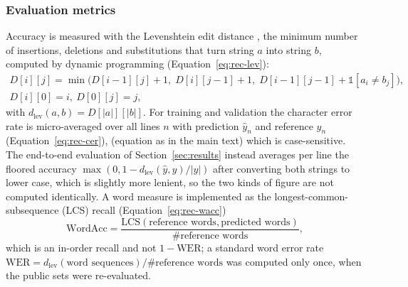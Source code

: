 \subsubsection{Evaluation metrics}

Accuracy is measured with the Levenshtein edit distance \cite{levenshtein1966}, the minimum number of insertions, deletions and substitutions that turn string $a$ into string $b$, computed by dynamic programming (Equation~\ref{eq:rec-lev}):
\begin{equation}
\begin{gathered}D[i][j]=\min\bigl(D[i-1][j]+1,\;D[i][j-1]+1,\;D[i-1][j-1]+\mathbb 1[a_i\ne b_j]\bigr),\\ D[i][0]=i,\ D[0][j]=j,\end{gathered}
\label{eq:rec-lev}
\end{equation}
with $d_{\mathrm{lev}}(a,b)=D[|a|][|b|]$.
For training and validation the character error rate is micro-averaged over all lines $n$ with prediction $\hat y_n$ and reference $y_n$ (Equation~\ref{eq:rec-cer}),
(equation as in the main text)
which is case-sensitive.
The end-to-end evaluation of Section~\ref{sec:results} instead averages per line the floored accuracy $\max(0,1-d_{\mathrm{lev}}(\hat y,y)/|y|)$ after converting both strings to lower case, which is slightly more lenient, so the two kinds of figure are not computed identically.
A word measure is implemented as the longest-common-subsequence (LCS) recall (Equation~\ref{eq:rec-wacc})
\begin{equation}
\mathrm{WordAcc}=\frac{\mathrm{LCS}(\text{reference words},\text{predicted words})}{\#\text{reference words}},
\label{eq:rec-wacc}
\end{equation}
which is an in-order recall and not $1-\mathrm{WER}$; a standard word error rate $\mathrm{WER}=d_{\mathrm{lev}}(\text{word sequences})/\#\text{reference words}$ was computed only once, when the public sets were re-evaluated.


